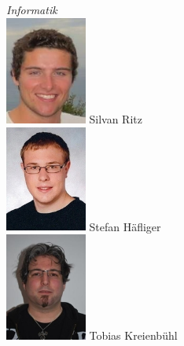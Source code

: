 \hfill

\begin{minipage}{0.4\textwidth}
\begin{flushright} \large
	\emph{Informatik} \\
	\includegraphics[width=0.2\textwidth]{./04_Projektmanagement/fig/silvanritz.jpg}
	Silvan Ritz\\
	\includegraphics[width=0.2\textwidth]{./04_Projektmanagement/fig/stefanhaefliger.jpg}
	Stefan Häfliger\\
	\includegraphics[width=0.2\textwidth]{./04_Projektmanagement/fig/tobiaskreienbuehl.jpg}
	Tobias Kreienbühl\\

\end{flushright}
\end{minipage}














